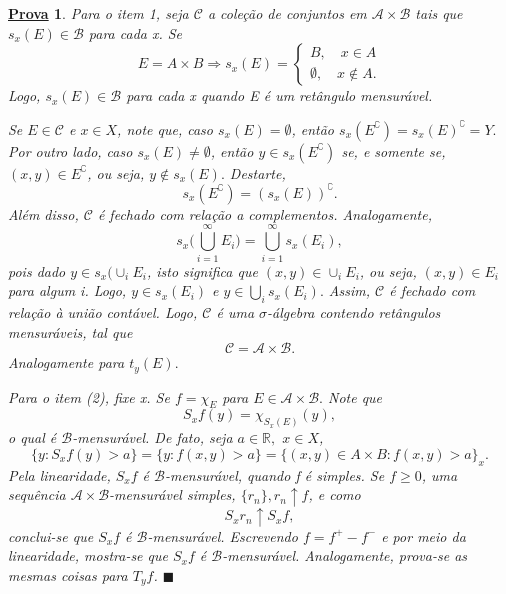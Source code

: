 \documentclass{article}
\newtheorem*{proof*}{\underline{Prova}}
\renewcommand\qedsymbol{$\blacksquare$}
\begin{document}
\begin{proof*}
  Para o item 1, seja \(\mathcal{C}\) a coleção de conjuntos em \(\mathcal{A}\times \mathcal{B}\) tais que \(s_x(E)\in \mathcal{B}\) para cada x. Se 
    \[
      E = A\times B \Rightarrow s_x(E)  = \left\{\begin{array}{ll}
          B,\quad x\in A\\ 
          \emptyset ,\quad x\not\in A.
        \end{array}\right.
    \]
    Logo, \(s_x(E)\in \mathcal{B}\) para cada x quando E é um retângulo mensurável. 

    Se \(E\in \mathcal{C}\) e \(x\in X\), note que, caso \(s_x(E) = \emptyset \), então \(s_x(E ^{\complement}) = s_x(E)^{\complement} = Y.\) Por outro lado, caso \(s_x(E)\neq\emptyset\),
então \(y\in s_x(E ^{\complement})\) se, e somente se, \((x, y)\in E ^{\complement}\), ou seja, \(y\not\in s_x(E).\) Destarte, 
  \[
    s_x(E ^{\complement}) = (s_x(E))^{\complement}.
  \]
  Além disso, \(\mathcal{C}\) é fechado com relação a complementos. Analogamente, 
    \[
      s_x \biggl( \bigcup_{i=1}^{\infty}E_{i}\biggr) = \bigcup_{i=1}^{\infty}s_x(E_{i}),
    \]
    pois dado \(y\in s_x(\cup_i E_{i}\), isto significa que \((x, y)\in \cup_i E_{i}\), ou seja, \((x, y)\in E_{i}\) para algum i. Logo, \(y\in s_x(E_{i})\) e \(y\in \bigcup_{i}^{}s_{x}(E_{i}).\)
  Assim, \(\mathcal{C}\) é fechado com relação à união contável. Logo, \(\mathcal{C}\) é uma \(\sigma \)-álgebra contendo retângulos mensuráveis, tal que 
    \[
      \mathcal{C} = \mathcal{A}\times \mathcal{B}.
    \]
    Analogamente para \(t_y(E).\)

    Para o item (2), fixe x. Se \(f=\chi_{E}\) para \(E\in \mathcal{A}\times \mathcal{B}.\) Note que 
      \[
        S_xf(y) = \chi_{S_x(E)}(y),
      \]
    o qual é \(\mathcal{B}\)-mensurável. De fato, seja \(a\in \mathbb{R},\) \(x\in X\), 
      \[
        \{y: S_{x}f(y) > a\} = \{y:f(x, y) > a\} = \{(x, y)\in A\times B: f(x, y) > a\}_{x}.
      \]
    Pela linearidade, \(S_{x}f\) é \(\mathcal{B}\)-mensurável, quando f é simples. Se \(f\geq 0\), uma sequência \(\mathcal{A}\times \mathcal{B}\)-mensurável simples, \(\{r_{n}\}, r_{n}\uparrow f\), e como 
      \[
        S_xr_{n}\uparrow S_{x}f,
      \]
    conclui-se que \(S_xf\) é \(\mathcal{B}\)-mensurável. Escrevendo \(f=f^{+}-f^{-}\) e por meio da linearidade, mostra-se que \(S_{x}f\) é \(\mathcal{B}\)-mensurável. Analogamente, prova-se as mesmas coisas
    para \(T_{y}f\). \qedsymbol
\end{proof*}
\end{document}
